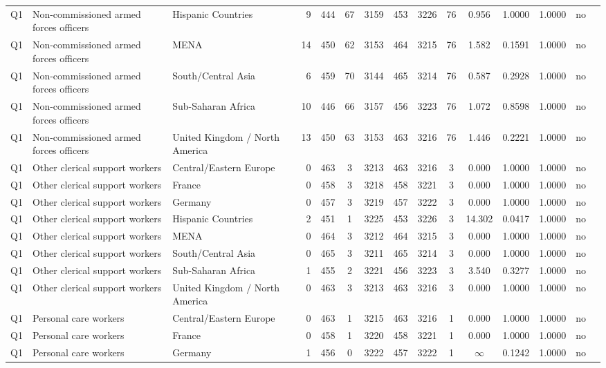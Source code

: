 \begin{longtable}{lllrcccccccccll}
Q1 & Non-commissioned armed forces officers & Hispanic Countries & 9 & 444 & 67 & 3159 & 453 & 3226 & 76 & 0.956 & 1.0000 & 1.0000 & no \\
Q1 & Non-commissioned armed forces officers & MENA & 14 & 450 & 62 & 3153 & 464 & 3215 & 76 & 1.582 & 0.1591 & 1.0000 & no \\
Q1 & Non-commissioned armed forces officers & South/Central Asia & 6 & 459 & 70 & 3144 & 465 & 3214 & 76 & 0.587 & 0.2928 & 1.0000 & no \\
Q1 & Non-commissioned armed forces officers & Sub-Saharan Africa & 10 & 446 & 66 & 3157 & 456 & 3223 & 76 & 1.072 & 0.8598 & 1.0000 & no \\
Q1 & Non-commissioned armed forces officers & United Kingdom / North America & 13 & 450 & 63 & 3153 & 463 & 3216 & 76 & 1.446 & 0.2221 & 1.0000 & no \\
Q1 & Other clerical support workers & Central/Eastern Europe & 0 & 463 & 3 & 3213 & 463 & 3216 & 3 & 0.000 & 1.0000 & 1.0000 & no \\
Q1 & Other clerical support workers & France & 0 & 458 & 3 & 3218 & 458 & 3221 & 3 & 0.000 & 1.0000 & 1.0000 & no \\
Q1 & Other clerical support workers & Germany & 0 & 457 & 3 & 3219 & 457 & 3222 & 3 & 0.000 & 1.0000 & 1.0000 & no \\
Q1 & Other clerical support workers & Hispanic Countries & 2 & 451 & 1 & 3225 & 453 & 3226 & 3 & 14.302 & 0.0417 & 1.0000 & no \\
Q1 & Other clerical support workers & MENA & 0 & 464 & 3 & 3212 & 464 & 3215 & 3 & 0.000 & 1.0000 & 1.0000 & no \\
Q1 & Other clerical support workers & South/Central Asia & 0 & 465 & 3 & 3211 & 465 & 3214 & 3 & 0.000 & 1.0000 & 1.0000 & no \\
Q1 & Other clerical support workers & Sub-Saharan Africa & 1 & 455 & 2 & 3221 & 456 & 3223 & 3 & 3.540 & 0.3277 & 1.0000 & no \\
Q1 & Other clerical support workers & United Kingdom / North America & 0 & 463 & 3 & 3213 & 463 & 3216 & 3 & 0.000 & 1.0000 & 1.0000 & no \\
Q1 & Personal care workers & Central/Eastern Europe & 0 & 463 & 1 & 3215 & 463 & 3216 & 1 & 0.000 & 1.0000 & 1.0000 & no \\
Q1 & Personal care workers & France & 0 & 458 & 1 & 3220 & 458 & 3221 & 1 & 0.000 & 1.0000 & 1.0000 & no \\
Q1 & Personal care workers & Germany & 1 & 456 & 0 & 3222 & 457 & 3222 & 1 & $\infty$ & 0.1242 & 1.0000 & no \\

\end{longtable}
